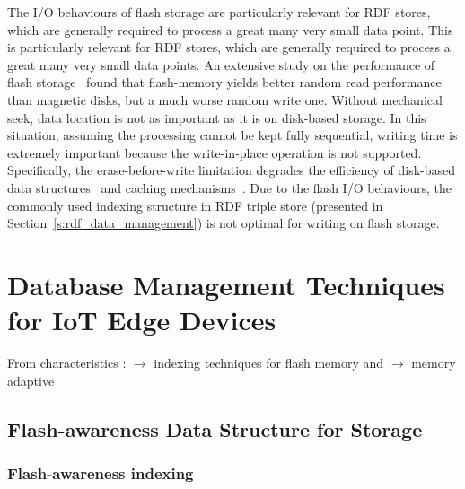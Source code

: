 The I/O behaviours of flash storage are particularly relevant for RDF stores, which are generally required to process a great many very small data point. 
This is particularly relevant for RDF stores, which are generally required to process a great many very small data points.
An extensive study on the performance of flash storage~\citep{Ajwani:2008} found that flash-memory yields better random read performance than magnetic disks, but a much worse random write one.  
Without mechanical seek, data location is not as important as it is on disk-based storage.
In this situation, assuming the processing cannot be kept fully sequential, writing time is extremely important because the write-in-place operation is not supported. 
Specifically, the erase-before-write limitation degrades the efficiency of disk-based data structures~\citep{Bouganim:2009} and caching mechanisms~\citep{Graefe:2007}. 
Due to the flash I/O behaviours, the commonly used indexing structure in RDF triple store (presented in Section~\ref{s:rdf_data_management}) is not optimal for writing on flash storage.

\section{Database Management Techniques for IoT Edge Devices}

From characteristics : $\to$ indexing techniques for flash memory and $\to$ memory adaptive 

\subsection{Flash-awareness Data Structure for Storage}

\subsubsection{Flash-awareness indexing}

